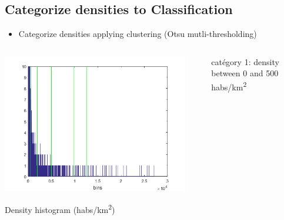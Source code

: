 \documentclass[c]{beamer}
\begin{document}
\subsection{Categorize densities to Classification}
\begin{frame}
\tableofcontents[currentsubsection]
\end{frame}

\begin{frame}
\begin{itemize}
 \item Categorize densities applying clustering (Otsu mutli-thresholding)
\end{itemize}

\begin{columns}
 \begin{column}{0.50\textwidth}
  \begin{overlayarea}{\linewidth}{3cm}
  \centering\vfill
  \includegraphics[scale=0.25]{images/labels/densite_histo_otsu_zoom.png}
  \end{overlayarea}
  \begin{overlayarea}{\linewidth}{0.5cm}
  \centering
  \tiny Density histogram (habs/km\textsuperscript{2})\par
  \end{overlayarea}
 \end{column}
 \begin{column}{0.50\textwidth}
  \begin{overlayarea}{\linewidth}{3cm}
  {\tiny
    \begin{itemize}
    \item[catégory 1:] density between 0 and 500 habs/km\textsuperscript{2}

\end{itemize}}
\end{overlayarea}
\end{column}
\end{columns}
\end{frame}
\end{document}
